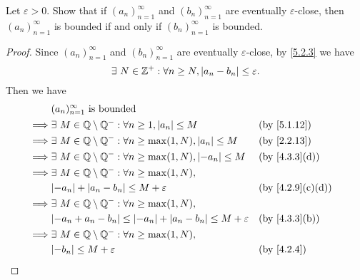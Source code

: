 \begin{ex}\label{ex:5.2.2}
  Let \(\varepsilon > 0\).
  Show that if \((a_n)_{n = 1}^{\infty}\) and \((b_n)_{n = 1}^{\infty}\) are eventually \(\varepsilon\)-close, then \((a_n)_{n = 1}^{\infty}\) is bounded if and only if \((b_n)_{n = 1}^{\infty}\) is bounded.
\end{ex}

\begin{proof}
  Since \((a_n)_{n = 1}^{\infty}\) and \((b_n)_{n = 1}^{\infty}\) are eventually \(\varepsilon\)-close, by \cref{5.2.3} we have
  \[
    \exists\ N \in \mathbb{Z}^+ : \forall n \geq N, \left\lvert a_n - b_n\right\rvert \leq \varepsilon.
  \]
  Then we have
  \begin{align*}
             & (a_n)_{n = 1}^\infty \text{ is bounded}                                                                                          \\
    \implies & \exists\ M \in \Q \setminus \Q^- : \forall n \geq 1, \abs{a_n} \leq M                        &  & \text{(by \cref{5.1.12})}      \\
    \implies & \exists\ M \in \Q \setminus \Q^- : \forall n \geq \max(1, N), \abs{a_n} \leq M               &  & \text{(by \cref{2.2.13})}      \\
    \implies & \exists\ M \in \Q \setminus \Q^- : \forall n \geq \max(1, N), \abs{-a_n} \leq M              &  & \text{(by \cref{4.3.3}(d))}    \\
    \implies & \exists\ M \in \Q \setminus \Q^- : \forall n \geq \max(1, N),                                                                    \\
             & \abs{-a_n} + \abs{a_n - b_n} \leq M + \varepsilon                                            &  & \text{(by \cref{4.2.9}(c)(d))} \\
    \implies & \exists\ M \in \Q \setminus \Q^- : \forall n \geq \max(1, N),                                                                    \\
             & \abs{-a_n + a_n - b_n} \leq \abs{-a_n} + \abs{a_n - b_n} \leq M + \varepsilon                &  & \text{(by \cref{4.3.3}(b))}    \\
    \implies & \exists\ M \in \Q \setminus \Q^- : \forall n \geq \max(1, N),                                                                    \\
             & \abs{-b_n} \leq M + \varepsilon                                                              &  & \text{(by \cref{4.2.4})}       \\

\end{align*}
\end{proof}
